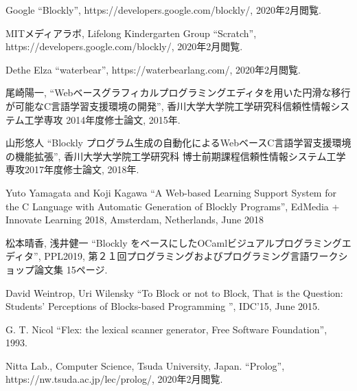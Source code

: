 \documentclass{risepaper}
\begin{document}
\begin{thebibliography}{99} %
                                  
 Google 
 ``Blockly'', https://developers.google.com/blockly/, 2020年2月閲覧.

 MITメディアラボ, Lifelong Kindergarten Group 
 ``Scratch'', https://developers.google.com/blockly/, 2020年2月閲覧.
 
 Dethe Elza
 ``waterbear'', https://waterbearlang.com/, 2020年2月閲覧.

 尾崎陽一,
 ``Webベースグラフィカルプログラミングエディタを用いた円滑な移行が可能なC言語学習支援環境の開発'', 香川大学大学院工学研究科信頼性情報システム工学専攻 2014年度修士論文, 2015年.
 
 山形悠人
 ``Blockly プログラム生成の自動化によるWebベースC言語学習支援環境の機能拡張'', 香川大学大学院工学研究科
博士前期課程信頼性情報システム工学専攻2017年度修士論文, 2018年.

 Yuto Yamagata and Koji Kagawa
 ``A Web-based Learning Support System for the C Language with Automatic Generation of Blockly Programs'', EdMedia + Innovate Learning 2018, Amsterdam, Netherlands, June 2018
 
 松本晴香, 浅井健一
 ``Blockly をベースにしたOCamlビジュアルプログラミングエディタ'', PPL2019, 第２１回プログラミングおよびプログラミング言語ワークショップ論文集 15ページ.
 
 David Weintrop, Uri Wilensky
 ``To Block or not to Block, That is the Question: Students’ Perceptions of Blocks-based Programming
'', IDC'15, June 2015. 

 G. T. Nicol
 ``Flex: the lexical scanner generator, Free Software Foundation'', 1993.
 
 Nitta Lab., Computer Science, Tsuda University, Japan.
 ``Prolog'', https://nw.tsuda.ac.jp/lec/prolog/, 2020年2月閲覧.

\end{thebibliography}



\insertindex %
\printindex
  
\end{document}
